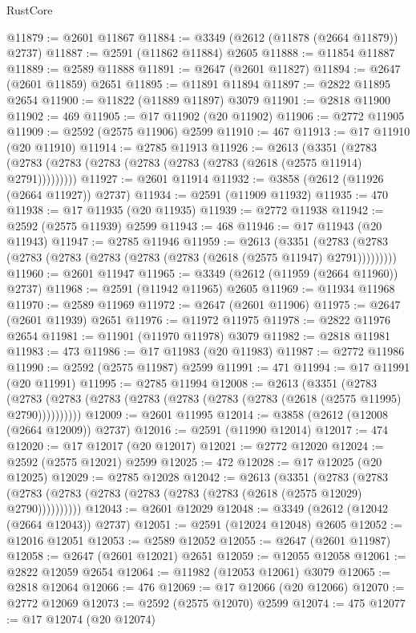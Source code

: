 \begin{lexlean}{RustCore}
\begin{coremodule}
@11879 := @2601 @11867
@11884 := @3349 (@2612 (@11878 (@2664 @11879)) @2737)
@11887 := @2591 (@11862 @11884) @2605
@11888 := @11854 @11887
@11889 := @2589 @11888
@11891 := @2647 (@2601 @11827)
@11894 := @2647 (@2601 @11859) @2651
@11895 := @11891 @11894
@11897 := @2822 @11895 @2654
@11900 := @11822 (@11889 @11897) @3079
@11901 := @2818 @11900
@11902 := 469
@11905 := @17 @11902 (@20 @11902)
@11906 := @2772 @11905
@11909 := @2592 (@2575 @11906) @2599
@11910 := 467
@11913 := @17 @11910 (@20 @11910)
@11914 := @2785 @11913
@11926 := @2613
    (@3351 (@2783 (@2783 (@2783 (@2783 (@2783 (@2783 (@2783 (@2618 (@2575 @11914) @2791)))))))))
@11927 := @2601 @11914
@11932 := @3858 (@2612 (@11926 (@2664 @11927)) @2737)
@11934 := @2591 (@11909 @11932)
@11935 := 470
@11938 := @17 @11935 (@20 @11935)
@11939 := @2772 @11938
@11942 := @2592 (@2575 @11939) @2599
@11943 := 468
@11946 := @17 @11943 (@20 @11943)
@11947 := @2785 @11946
@11959 := @2613
    (@3351 (@2783 (@2783 (@2783 (@2783 (@2783 (@2783 (@2783 (@2618 (@2575 @11947) @2791)))))))))
@11960 := @2601 @11947
@11965 := @3349 (@2612 (@11959 (@2664 @11960)) @2737)
@11968 := @2591 (@11942 @11965) @2605
@11969 := @11934 @11968
@11970 := @2589 @11969
@11972 := @2647 (@2601 @11906)
@11975 := @2647 (@2601 @11939) @2651
@11976 := @11972 @11975
@11978 := @2822 @11976 @2654
@11981 := @11901 (@11970 @11978) @3079
@11982 := @2818 @11981
@11983 := 473
@11986 := @17 @11983 (@20 @11983)
@11987 := @2772 @11986
@11990 := @2592 (@2575 @11987) @2599
@11991 := 471
@11994 := @17 @11991 (@20 @11991)
@11995 := @2785 @11994
@12008 := @2613
    (@3351
      (@2783 (@2783 (@2783 (@2783 (@2783 (@2783 (@2783 (@2783 (@2618 (@2575 @11995) @2790))))))))))
@12009 := @2601 @11995
@12014 := @3858 (@2612 (@12008 (@2664 @12009)) @2737)
@12016 := @2591 (@11990 @12014)
@12017 := 474
@12020 := @17 @12017 (@20 @12017)
@12021 := @2772 @12020
@12024 := @2592 (@2575 @12021) @2599
@12025 := 472
@12028 := @17 @12025 (@20 @12025)
@12029 := @2785 @12028
@12042 := @2613
    (@3351
      (@2783 (@2783 (@2783 (@2783 (@2783 (@2783 (@2783 (@2783 (@2618 (@2575 @12029) @2790))))))))))
@12043 := @2601 @12029
@12048 := @3349 (@2612 (@12042 (@2664 @12043)) @2737)
@12051 := @2591 (@12024 @12048) @2605
@12052 := @12016 @12051
@12053 := @2589 @12052
@12055 := @2647 (@2601 @11987)
@12058 := @2647 (@2601 @12021) @2651
@12059 := @12055 @12058
@12061 := @2822 @12059 @2654
@12064 := @11982 (@12053 @12061) @3079
@12065 := @2818 @12064
@12066 := 476
@12069 := @17 @12066 (@20 @12066)
@12070 := @2772 @12069
@12073 := @2592 (@2575 @12070) @2599
@12074 := 475
@12077 := @17 @12074 (@20 @12074)

\end{coremodule}
\end{lexlean}
